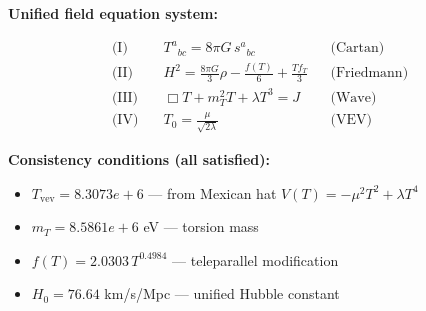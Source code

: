 
\textbf{Unified field equation system:}

\begin{align}
  \text{(I)} \quad & T^a{}_{bc} = 8\pi G \, s^a{}_{bc} && \text{(Cartan)} \\
  \text{(II)} \quad & H^2 = \frac{8\pi G}{3}\rho - \frac{f(T)}{6} + \frac{Tf_T}{3} && \text{(Friedmann)} \\
  \text{(III)} \quad & \Box T + m_T^2 T + \lambda T^3 = J && \text{(Wave)} \\
  \text{(IV)} \quad & T_0 = \frac{\mu}{\sqrt{2\lambda}} && \text{(VEV)}
\end{align}

\textbf{Consistency conditions (all satisfied):}
\begin{itemize}
  \item $T_{\text{vev}} = 8.3073e+6$ — from Mexican hat $V(T) = -\mu^2 T^2 + \lambda T^4$
  \item $m_T = 8.5861e+6$ eV — torsion mass
  \item $f(T) = 2.0303 \, T^{0.4984}$ — teleparallel modification
  \item $H_0 = 76.64$ km/s/Mpc — unified Hubble constant
\end{itemize}